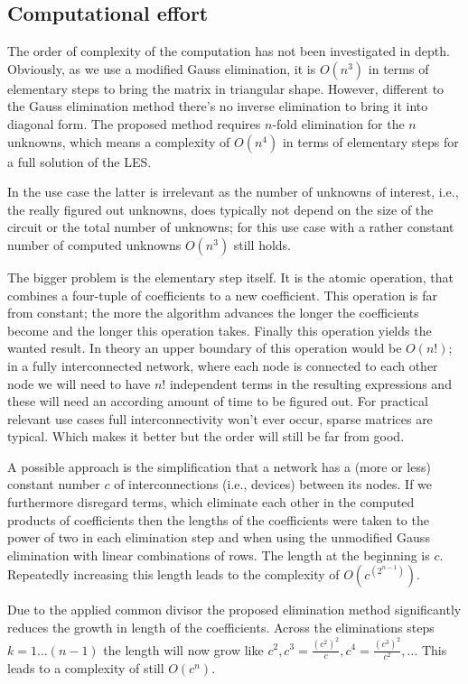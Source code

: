 \subsection{Computational effort}

The order of complexity of the computation has not been investigated in
depth. Obviously, as we use a modified Gauss elimination, it is $O(n^3)$
in terms of elementary steps to bring the matrix in triangular shape.
However, different to the Gauss elimination method there's no inverse
elimination to bring it into diagonal form. The proposed method requires
$n$-fold elimination for the $n$ unknowns, which means a complexity of
$O(n^4)$ in terms of elementary steps for a full solution of the LES.

In the \linnet{} use case the latter is irrelevant as the number of
unknowns of interest, i.e., the really figured out unknowns, does typically
not depend on the size of the circuit or the total number of unknowns; for
this use case with a rather constant number of computed unknowns $O(n^3)$
still holds.

The bigger problem is the elementary step itself. It is the atomic operation, that
combines a four-tuple of coefficients to a new coefficient. This operation
is far from constant; the more the algorithm advances the longer the
coefficients become and the longer this operation takes. Finally this
operation yields the wanted result. In theory an upper boundary of this
operation would be $O(n!)$; in a fully interconnected network, where each
node is connected to each other node we will need to have $n!$ independent
terms in the resulting expressions and these will need an according amount
of time to be figured out. For practical relevant use cases full
interconnectivity won't ever occur, sparse matrices are typical. Which makes
it better but the order will still be far from good.

A possible approach is the simplification that a network has a (more or
less) constant number $c$ of interconnections (i.e., devices) between its
nodes. If we furthermore disregard terms, which eliminate each other in
the computed products of coefficients then the lengths of the coefficients
were taken to the power of two in each elimination step and when using the
unmodified Gauss elimination with linear combinations of rows. The
length at the beginning is $c$. Repeatedly increasing this length leads to
the complexity of $O(c^{(2^{n-1})})$.

Due to the applied common divisor the proposed elimination method
significantly reduces the growth in length of the coefficients. Across the
eliminations steps $k=1 \ldots (n-1)$ the length will now grow like $c^2, c^3
= \frac{(c^2)^2}{c}, c^4 = \frac{(c^3)^2}{c^2}, \ldots$ This leads to a
complexity of still $O(c^n)$.

